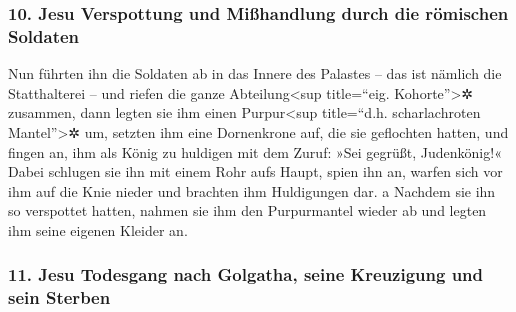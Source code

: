 \hypertarget{jesu-verspottung-und-miuxdfhandlung-durch-die-ruxf6mischen-soldaten}{%
\subsubsection{10. Jesu Verspottung und Mißhandlung durch die römischen
Soldaten}\label{jesu-verspottung-und-miuxdfhandlung-durch-die-ruxf6mischen-soldaten}}

 Nun führten ihn die Soldaten ab in das Innere des
Palastes -- das ist nämlich die Statthalterei -- und riefen die ganze
Abteilung\textless sup title=``eig. Kohorte''\textgreater✲ zusammen,
 dann legten sie ihm einen Purpur\textless sup
title=``d.h. scharlachroten Mantel''\textgreater✲ um, setzten ihm eine
Dornenkrone auf, die sie geflochten hatten,  und fingen
an, ihm als König zu huldigen mit dem Zuruf: »Sei gegrüßt, Judenkönig!«
 Dabei schlugen sie ihn mit einem Rohr aufs Haupt, spien
ihn an, warfen sich vor ihm auf die Knie nieder und brachten ihm
Huldigungen dar.  a Nachdem sie ihn so verspottet hatten,
nahmen sie ihm den Purpurmantel wieder ab und legten ihm seine eigenen
Kleider an.

\hypertarget{jesu-todesgang-nach-golgatha-seine-kreuzigung-und-sein-sterben}{%
\subsubsection{11. Jesu Todesgang nach Golgatha, seine Kreuzigung und
sein
Sterben}\label{jesu-todesgang-nach-golgatha-seine-kreuzigung-und-sein-sterben}}

